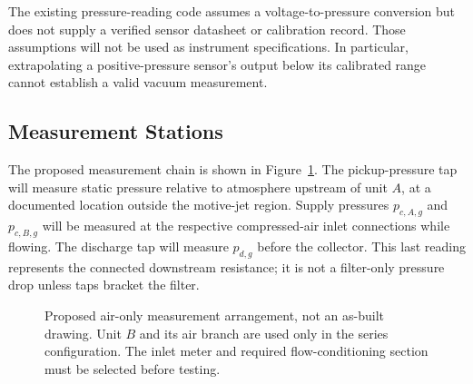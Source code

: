 The existing pressure-reading code assumes a voltage-to-pressure conversion but does not supply a verified sensor datasheet or calibration record. Those assumptions will not be used as instrument specifications. In particular, extrapolating a positive-pressure sensor's output below its calibrated range cannot establish a valid vacuum measurement.

\subsection{Measurement Stations}
The proposed measurement chain is shown in Figure~\ref{fig:vacuum-test-stations}. The pickup-pressure tap will measure static pressure relative to atmosphere upstream of unit $A$, at a documented location outside the motive-jet region. Supply pressures $p_{c,A,g}$ and $p_{c,B,g}$ will be measured at the respective compressed-air inlet connections while flowing. The discharge tap will measure $p_{d,g}$ before the collector. This last reading represents the connected downstream resistance; it is not a filter-only pressure drop unless taps bracket the filter.

\begin{figure}[htbp]
\centering
{}
\caption[Proposed vacuum characterization measurement stations]{Proposed air-only measurement arrangement, not an as-built drawing. Unit $B$ and its air branch are used only in the series configuration. The inlet meter and required flow-conditioning section must be selected before testing.}
\label{fig:vacuum-test-stations}
\end{figure}

